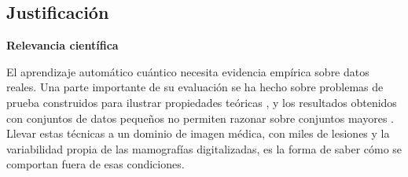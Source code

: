 
\subsection{Justificación}
\label{sec:justificacion}

\textbf{Relevancia científica}

El aprendizaje automático cuántico necesita evidencia empírica sobre datos reales. Una parte
importante de su evaluación se ha hecho sobre problemas de prueba construidos para ilustrar
propiedades teóricas \cite{AlvarezEstevez2024QuantumKernelBench}, y los resultados obtenidos con
conjuntos de datos pequeños no permiten razonar sobre conjuntos mayores \cite{Bowles2024Benchmarking}.
Llevar estas técnicas a un dominio de imagen médica, con miles de lesiones y la variabilidad propia de
las mamografías digitalizadas, es la forma de saber cómo se comportan fuera de esas condiciones.

